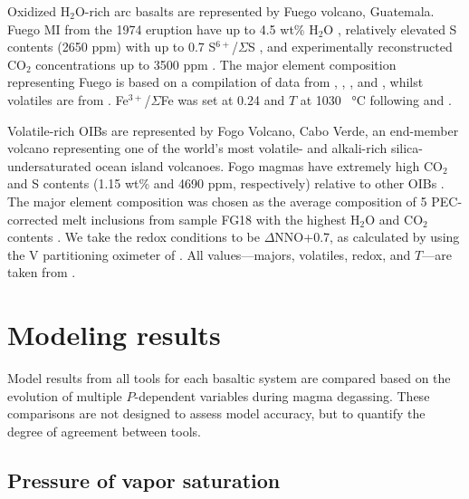 \documentclass[draft, english]{volcanica-template}
\begin{document}
Oxidized H$_2$O-rich arc basalts are represented by Fuego volcano, Guatemala. Fuego MI from the 1974 eruption have up to 4.5 wt\% H$_2$O \parencite{rasmussen2020vapor}, relatively elevated S contents (2650 ppm) with up to 0.7 S$^{6+}$/$\Sigma$S \parencite{taracsak2023sulfur}, and experimentally reconstructed CO$_2$ concentrations up to 3500 ppm \parencite{rasmussen2020vapor}. The major element composition representing Fuego is based on a compilation of data from \textcite{rasmussen2020vapor}, \textcite{lloyd2013}, \textcite{moore2015bubbles}, and \textcite{newcombe2020}, whilst volatiles are from \textcite{rasmussen2020vapor}. Fe$^{3+}$/$\Sigma$Fe was set at 0.24 and $T$ at 1030 \SI{}{\celsius} following \textcite{lloyd2013} and \textcite{Ding2023}.

Volatile-rich OIBs are represented by Fogo Volcano, Cabo Verde, an end-member volcano representing one of the world's most volatile- and alkali-rich silica-undersaturated ocean island volcanoes. Fogo magmas have extremely high CO$_2$ and S contents (1.15 wt\% and 4690 ppm, respectively) relative to other OIBs \parencite{devitre2023oceanic}. The major element composition was chosen as the average composition of 5 PEC-corrected melt inclusions from sample FG18 with the highest H$_2$O and CO$_2$ contents \parencite{devitre2023oceanic}. We take the redox conditions to be $\Delta$NNO+0.7, as calculated by \textcite{devitre2023oceanic} using the V partitioning oximeter of \textcite{canil2002vanadium}. All values—majors, volatiles, redox, and $T$—are taken from \textcite{devitre2023oceanic}.

\section{Modeling results}
\label{sec:results}
Model results from all tools for each basaltic system are compared based on the evolution of multiple $P$-dependent variables during magma degassing. These comparisons are not designed to assess model accuracy, but to quantify the degree of agreement between tools.

\subsection{Pressure of vapor saturation}
\label{sec:results-saturationpressure}
\end{document}
